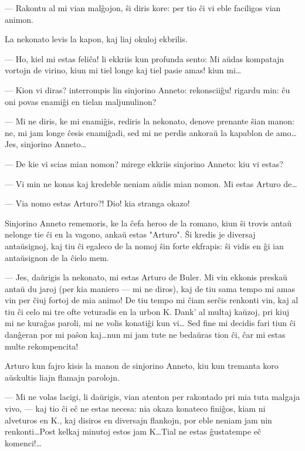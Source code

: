  --- Rakontu al mi vian mal\^gojon, \^si diris kore: per tio \^ci vi eble
faciligos vian animon.

   La nekonato levis la kapon, kaj liaj okuloj ekbrilis.

 --- Ho, kiel mi estas feli\^ca! li ekkriis kun profunda sento: Mi
a\u udas kompatajn vortojn de virino, kiun mi tiel longe kaj tiel
pasie amas! kiun mi\dots

 --- Kion vi diras? interrompis lin sinjorino Anneto: rekonscii\^gu!
rigardu min: \^cu oni povas enami\^gi en tielan maljunulinon?

 --- Mi ne diris, ke mi enami\^gis, rediris la nekonato, denove prenante
\^sian manon: ne, mi jam longe \^cesis enami\^gadi, sed mi ne perdis
ankora\u u la kapablon de amo\dots Jes, sinjorino Anneto\dots

 --- De kie vi scias mian nomon? mirege ekkriis sinjorino Anneto: kiu
vi estas?

 --- Vi min ne konas kaj kredeble neniam a\u udis mian nomon. Mi estas
Arturo de\dots

 --- Via nomo estas Arturo?! Dio! kia stranga okazo!

   Sinjorino Anneto rememoris, ke la \^cefa heroo de la romano, kiun \^si
trovis anta\u u nelonge tie \^ci en la vagono, anka\u u estas
"Arturo". \^Si kredis je diversaj anta\u usignoj, kaj tiu \^ci
egaleco de la nomoj \^sin forte ekfrapis: \^si vidis en \^gi ian
anta\u usignon de la \^cielo mem.

 --- Jes, da\u urigis la nekonato, mi estas Arturo de Buler. Mi vin
ekkonis preska\u u anta\u u du jaroj (per kia maniero --- mi ne
diros), kaj de tiu sama tempo mi amas vin per \^ciuj fortoj de mia
animo! De tiu tempo mi \^ciam ser\^cis renkonti vin, kaj al tiu \^ci
celo mi tre ofte veturadis en la urbon K. Dank' al multaj ka\u uzoj,
pri kiuj mi ne kura\^gas paroli, mi ne volis konati\^gi kun vi\dots
Sed fine mi decidis fari tiun \^ci dan\^geran por mi pa\^son
kaj\dots nun mi jam tute ne beda\u uras tion \^ci, \^car mi estas
multe rekompencita!

   Arturo kun fajro kisis la manon de sinjorino Anneto, kiu kun tremanta
koro a\u uskultis liajn flamajn parolojn.

 --- Mi ne volas lacigi, li da\u urigis, vian atenton per rakontado pri
mia tuta malgaja vivo, --- kaj tio \^ci e\^c ne estas necesa: nia
okaza konateco fini\^gos, kiam ni alveturos en K., kaj disiros en
diversajn flankojn, por eble neniam jam nin renkonti\dots Post
kelkaj minutoj estos jam K\dots Tial ne estas \^gustatempe e\^c
komenci!\dots

